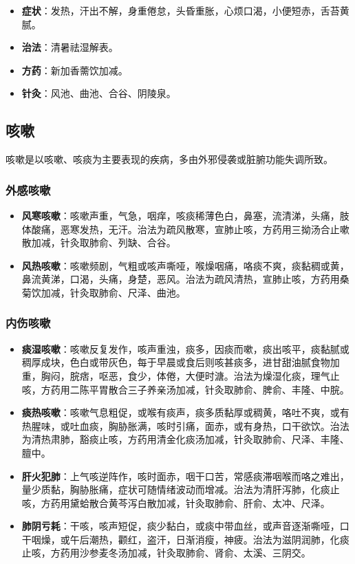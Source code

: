 \documentclass[12pt,UTF8]{ctexbook}
\begin{document}
\begin{itemize}
\item \textbf{症状}：发热，汗出不解，身重倦怠，头昏重胀，心烦口渴，小便短赤，舌苔黄腻。
\item \textbf{治法}：清暑祛湿解表。
\item \textbf{方药}：新加香薷饮加减。
\item \textbf{针灸}：风池、曲池、合谷、阴陵泉。
\end{itemize}

\subsection{咳嗽}

咳嗽是以咳嗽、咳痰为主要表现的疾病，多由外邪侵袭或脏腑功能失调所致。

\subsubsection{外感咳嗽}

\begin{itemize}
\item \textbf{风寒咳嗽}：咳嗽声重，气急，咽痒，咳痰稀薄色白，鼻塞，流清涕，头痛，肢体酸痛，恶寒发热，无汗。治法为疏风散寒，宣肺止咳，方药用三拗汤合止嗽散加减，针灸取肺俞、列缺、合谷。
\item \textbf{风热咳嗽}：咳嗽频剧，气粗或咳声嘶哑，喉燥咽痛，咯痰不爽，痰黏稠或黄，鼻流黄涕，口渴，头痛，身楚，恶风。治法为疏风清热，宣肺止咳，方药用桑菊饮加减，针灸取肺俞、尺泽、曲池。
\end{itemize}

\subsubsection{内伤咳嗽}

\begin{itemize}
\item \textbf{痰湿咳嗽}：咳嗽反复发作，咳声重浊，痰多，因痰而嗽，痰出咳平，痰黏腻或稠厚成块，色白或带灰色，每于早晨或食后则咳甚痰多，进甘甜油腻食物加重，胸闷，脘痞，呕恶，食少，体倦，大便时溏。治法为燥湿化痰，理气止咳，方药用二陈平胃散合三子养亲汤加减，针灸取肺俞、脾俞、丰隆、中脘。
\item \textbf{痰热咳嗽}：咳嗽气息粗促，或喉有痰声，痰多质黏厚或稠黄，咯吐不爽，或有热腥味，或吐血痰，胸胁胀满，咳时引痛，面赤，或有身热，口干欲饮。治法为清热肃肺，豁痰止咳，方药用清金化痰汤加减，针灸取肺俞、尺泽、丰隆、膻中。
\item \textbf{肝火犯肺}：上气咳逆阵作，咳时面赤，咽干口苦，常感痰滞咽喉而咯之难出，量少质黏，胸胁胀痛，症状可随情绪波动而增减。治法为清肝泻肺，化痰止咳，方药用黛蛤散合黄芩泻白散加减，针灸取肺俞、肝俞、太冲、尺泽。
\item \textbf{肺阴亏耗}：干咳，咳声短促，痰少黏白，或痰中带血丝，或声音逐渐嘶哑，口干咽燥，或午后潮热，颧红，盗汗，日渐消瘦，神疲。治法为滋阴润肺，化痰止咳，方药用沙参麦冬汤加减，针灸取肺俞、肾俞、太溪、三阴交。
\end{itemize}
\end{document}

